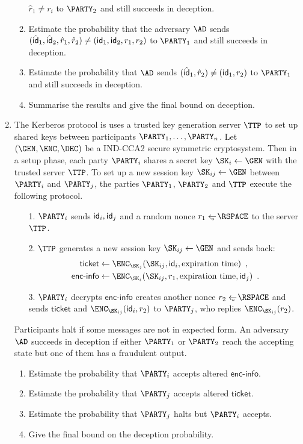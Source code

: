 \documentclass{article}
\begin{document}
\begin{enumerate}
\begin{enumerate}
    $\hat{r}_1\neq r_i$ to $\PARTY_2$ and still succeeds in deception.
  \item Estimate the probability that the adversary $\AD$ sends
    $(\hat{\mathsf{id}}_1,\hat{\mathsf{id}}_2,\hat{r}_1,\hat{r}_2)\neq
    (\mathsf{id}_1,\mathsf{id}_2,r_1,r_2)$ to $\PARTY_1$ and still succeeds in
    deception.
  \item Estimate the probability that $\AD$ sends
    $(\hat{\mathsf{id}}_1,\hat{r}_2)\neq(\mathsf{id}_1,r_2)$ to $\PARTY_1$ and still
    succeeds in deception.
  \item Summarise the results and give the final bound on deception.
  \end{enumerate}


\item The Kerberos protocol is uses a trusted key generation server
  $\TTP$ to set up shared keys between participants
  $\PARTY_1,\ldots,\PARTY_n$. Let $(\GEN,\ENC,\DEC)$ be a IND-CCA2
  secure symmetric cryptosystem. Then in a setup phase, each party
  $\PARTY_i$ shares a secret key $\SK_i\gets\GEN$ with the trusted
  server $\TTP$. To set up a new session key $\SK_{ij}\gets\GEN$
  between $\PARTY_i$ and $\PARTY_j$, the parties $\PARTY_1$,
  $\PARTY_2$ and $\TTP$ execute the following protocol.
  \begin{enumerate}
  \item[1.] $\PARTY_i$ sends $\mathsf{id}_i,\mathsf{id}_j$ and a random nonce
    $r_1\getsu\RSPACE$ to the server $\TTP$.
  \item[2.] $\TTP$ generates a new session key $\SK_{ij}\gets\GEN$ and
    sends back:
    \begin{align*}
      \mathsf{ticket}&\gets\ENC_{\SK_j}(\SK_{ij},\ID_i,\text{expiration
        time})\enspace,\\
      \mathsf{enc\text{-}info}&\gets\ENC_{\SK_i}(\SK_{ij},r_1,\text{expiration
      time},\ID_j)\enspace.
    \end{align*}
  \item[3.] $\PARTY_i$ decrypts $\mathsf{enc\text{-}info}$ creates
    another nonce $r_2\getsu\RSPACE$ and sends $\mathsf{ticket}$ and
    $\ENC_{\SK_{ij}}(\ID_i,r_2)$ to $\PARTY_j$, who replies
    $\ENC_{\SK_{ij}}(r_2)$.
  \end{enumerate}
  Participants halt if some messages are not in expected form.  An
  adversary $\AD$ succeeds in deception if either $\PARTY_1$ or
  $\PARTY_2$ reach the accepting state but one of them has a
  fraudulent output.
  \begin{enumerate}
  \item Estimate the probability that $\PARTY_i$ accepts altered
    $\mathsf{enc\text{-}info}$.
  \item Estimate the probability that $\PARTY_j$ accepts altered $\mathsf{ticket}$.
  \item Estimate the probability that $\PARTY_j$ halts but $\PARTY_i$
    accepts.
  \item Give the final bound on the deception probability. 
  \end{enumerate}


\end{enumerate}
\end{document}
